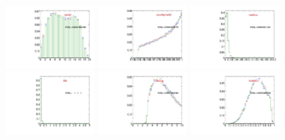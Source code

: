 \begin{figure}
  \centering
  \includegraphics[width=0.3\textwidth]{Figures/VariablesComparison/Data_barrel_figs_3h/ntrk20}
  \includegraphics[width=0.3\textwidth]{Figures/VariablesComparison/Data_barrel_figs_3h/cosAlpha3D}
  \includegraphics[width=0.3\textwidth]{Figures/VariablesComparison/Data_barrel_figs_3h/minDca}
  \includegraphics[width=0.3\textwidth]{Figures/VariablesComparison/Data_barrel_figs_3h/l3d}
  \includegraphics[width=0.3\textwidth]{Figures/VariablesComparison/Data_barrel_figs_3h/l3dsig}
  \includegraphics[width=0.3\textwidth]{Figures/VariablesComparison/Data_barrel_figs_3h/isolation}

\end{figure}
